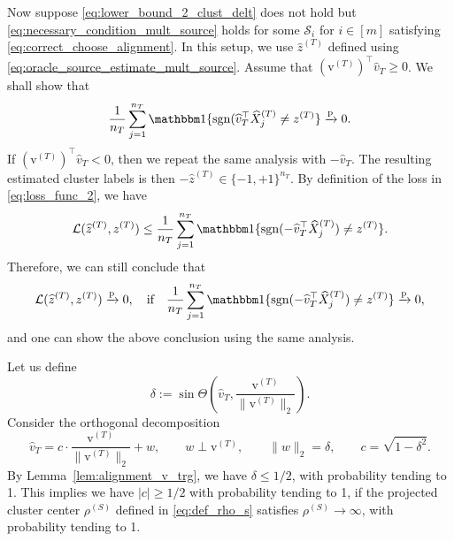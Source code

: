 \documentclass[10pt]{article}
\newcommand{\sgn}{\operatorname{sgn}}
\newcommand{\convp}{\xrightarrow{\mathrm{p}}}
\newcommand{\wh}{\widehat}
\newcommand{\trg}{T}
\newcommand{\nT}{n_{\trg}}
\newcommand{\ztar}{z^{(\trg)}}
\newcommand{\hatztar}{\wh{z}^{(\trg)}}
\newcommand{\rmqv}{\mathrm{v}^{(\trg)}}
\newcommand{\calS}{\mathcal S}
\newcommand{\src}{S}
\begin{document}
Now suppose \eqref{eq:lower_bound_2_clust_delt} does not hold but \eqref{eq:necessary_condition_mult_source} holds for some $\calS_i$ for $i \in [m]$ satisfying \eqref{eq:correct_choose_alignment}. 
In this setup, we use $\hatztar$ defined using \eqref{eq:oracle_source_estimate_mult_source}. Assume that $(\rmqv)^\top \wh v_\trg \ge 0$. We shall show that
\begin{align}
\label{eq:consistent_nec_cond}
    \frac{1}{\nT}\sum_{j =1}^{\nT}\mathbbm 1\{\sgn(\wh v^\top_\trg\wh{X}^{(\trg)}_j \neq \ztar\} \convp 0.
\end{align}
If $(\rmqv)^\top \wh v_\trg < 0$, then we repeat the same analysis with $-\wh v_\trg$. The resulting estimated cluster labels is then $-\hatztar \in \{-1,+1\}^{\nT}$. By definition of the loss in \eqref{eq:loss_func_2}, we have
\begin{align}
    \mathcal L(\hatztar,\ztar) \le \frac{1}{\nT}\sum_{j =1}^{\nT}\mathbbm 1\{\sgn(-\wh v^\top_\trg\wh{X}^{(\trg)}_j) \neq \ztar\}.
\end{align}
Therefore, we can still conclude that
\[
\mathcal L(\hatztar,\ztar) \convp 0, \quad \mbox{if}\quad \frac{1}{\nT}\sum_{j =1}^{\nT}\mathbbm 1\{\sgn(-\wh v^\top_\trg\wh{X}^{(\trg)}_j) \neq \ztar\} \convp 0,
\]
and one can show the above conclusion using the same analysis.

Let us define
\[
\delta:=\sin\Theta\left(\wh v_\trg,\frac{\rmqv}{\|\rmqv\|_2}\right).
\]
Consider the orthogonal decomposition
\begin{equation}
\label{eq:eigenvector_decomposition}
\wh v_\trg=c\cdot\frac{\rmqv}{\|\rmqv\|_2}+w, \qquad w\perp \rmqv, \qquad \|w\|_2=\delta, \qquad c=\sqrt{1-\delta^2}.
\end{equation}
By Lemma~\ref{lem:alignment_v_trg}, we have $\delta\le1/2$, with probability tending to 1. This implies we have $|c| \ge 1/2$ with probability tending to 1, if the projected cluster center $\rho^{(\src)}$ defined in \eqref{eq:def_rho_s} satisfies $\rho^{(\src)} \to \infty$, with probability tending to 1.
\end{document}

